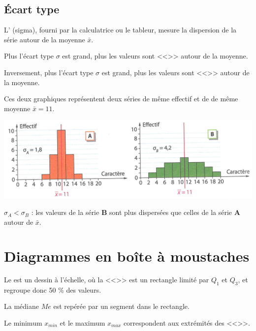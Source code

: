 \documentclass[12pt,a4paper]{article}
\begin{document}
\subsection{\'Ecart type}

\begin{mydef}
	L' (sigma), fourni par la calculatrice ou le tableur, mesure la dispersion de la série autour de la moyenne $\bar{x}$. 
	
	Plus l'écart type $\sigma$ est grand, plus les valeurs sont <<>> autour de la moyenne. 
	
	Inversement, plus l'écart type $\sigma$ est grand, plus les valeurs sont <<>> autour de la moyenne.
\end{mydef}	

\begin{myex}
	Ces deux graphiques représentent deux séries de même effectif et de de même moyenne $\bar{x} = 11$.
	
	\includegraphics[scale=0.9, angle=-1.1, origin=c]{img/ex_ecart_type}
	
	$\sigma _A < \sigma _B$ : les valeurs de la série $\mathbf{B}$ sont plus dispersées que celles de la série $\mathbf{A}$ autour de $\bar{x}$. 
\end{myex}
			

\section{Diagrammes en boîte à moustaches}

\begin{mydef}
	Le  est un dessin à l'échelle, où la <<>> est un rectangle limité par $Q_1$ et $Q_3$, et regroupe donc 50 \% des valeurs.
	
	La médiane $Me$ est repérée par un segment dans le rectangle.
	
	Le minimum $x_{min}$ et le maximum $x_{max}$ correspondent aux extrémités des <<>>.
\end{mydef}
\end{document}
